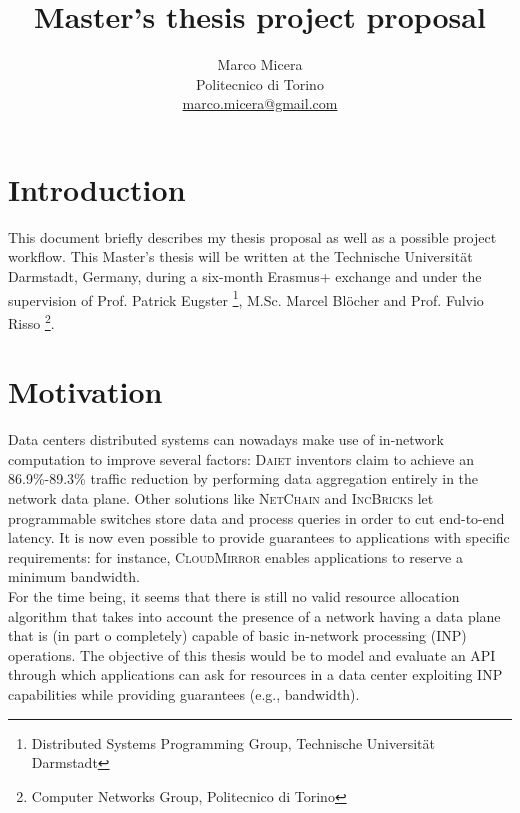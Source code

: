 \documentclass[letterpaper,twocolumn,10pt]{article}
\begin{document}
\title{Master's thesis project proposal}

\date{}

\author{
{   \rm Marco Micera}\\
    Politecnico di Torino\\
    \href{mailto:marco.micera@gmail.com}{marco.micera@gmail.com}
}
\maketitle

\section*{Introduction}
This document briefly describes my thesis proposal as well as a possible project workflow. This Master's thesis will be written at the Technische Universit{\"a}t Darmstadt, Germany, during a six-month Erasmus+ exchange and under the supervision of Prof. Patrick Eugster \footnote[2]{\label{tuda} Distributed Systems Programming Group, Technische Universit{\"a}t Darmstadt}, M.Sc. Marcel Bl{\"o}cher  and Prof. Fulvio Risso \footnote[3]{\label{polito} Computer Networks Group, Politecnico di Torino}.

\section{Motivation} \label{motivation}
Data centers distributed systems can nowadays make use of in-network computation to improve several factors: \textsc{Daiet} \cite{daiet} inventors claim to achieve an 86.9\%-89.3\% traffic reduction by performing data aggregation entirely in the network data plane. Other solutions like \textsc{NetChain} \cite{netchain} and \textsc{IncBricks} \cite{incbricks} let programmable switches store data and process queries in order to cut end-to-end latency. It is now even possible to provide guarantees to applications with specific requirements: for instance, \textsc{CloudMirror} \cite{cloudmirror} enables applications to reserve a minimum bandwidth.\\ For the time being, it seems that there is still no valid resource allocation algorithm that takes into account the presence of a network having a data plane that is (in part o completely) capable of basic in-network processing (INP) operations. The objective of this thesis would be to model and evaluate an API through which applications can ask for resources in a data center exploiting INP capabilities while providing guarantees (e.g., bandwidth).
\end{document}
